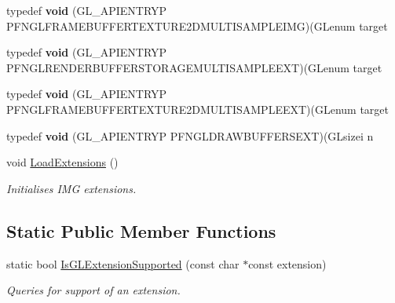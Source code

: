 \begin{DoxyCompactItemize}
\item 
\hypertarget{class_c_p_v_r_tgles2_ext_ac0e4abcfeeaaf1da925963d93e23a208}{typedef {\bfseries void} (G\+L\+\_\+\+A\+P\+I\+E\+N\+T\+R\+Y\+P P\+F\+N\+G\+L\+F\+R\+A\+M\+E\+B\+U\+F\+F\+E\+R\+T\+E\+X\+T\+U\+R\+E2\+D\+M\+U\+L\+T\+I\+S\+A\+M\+P\+L\+E\+I\+M\+G)(G\+Lenum target}\label{class_c_p_v_r_tgles2_ext_ac0e4abcfeeaaf1da925963d93e23a208}

\item 
\hypertarget{class_c_p_v_r_tgles2_ext_a30b0d1ac6df809ce53b9fc4727f64f67}{typedef {\bfseries void} (G\+L\+\_\+\+A\+P\+I\+E\+N\+T\+R\+Y\+P P\+F\+N\+G\+L\+R\+E\+N\+D\+E\+R\+B\+U\+F\+F\+E\+R\+S\+T\+O\+R\+A\+G\+E\+M\+U\+L\+T\+I\+S\+A\+M\+P\+L\+E\+E\+X\+T)(G\+Lenum target}\label{class_c_p_v_r_tgles2_ext_a30b0d1ac6df809ce53b9fc4727f64f67}

\item 
\hypertarget{class_c_p_v_r_tgles2_ext_aa1002af68291ea507e96280ccf63bdf0}{typedef {\bfseries void} (G\+L\+\_\+\+A\+P\+I\+E\+N\+T\+R\+Y\+P P\+F\+N\+G\+L\+F\+R\+A\+M\+E\+B\+U\+F\+F\+E\+R\+T\+E\+X\+T\+U\+R\+E2\+D\+M\+U\+L\+T\+I\+S\+A\+M\+P\+L\+E\+E\+X\+T)(G\+Lenum target}\label{class_c_p_v_r_tgles2_ext_aa1002af68291ea507e96280ccf63bdf0}

\item 
\hypertarget{class_c_p_v_r_tgles2_ext_a7c81cff8538e282ba685a095662de50e}{typedef {\bfseries void} (G\+L\+\_\+\+A\+P\+I\+E\+N\+T\+R\+Y\+P P\+F\+N\+G\+L\+D\+R\+A\+W\+B\+U\+F\+F\+E\+R\+S\+E\+X\+T)(G\+Lsizei n}\label{class_c_p_v_r_tgles2_ext_a7c81cff8538e282ba685a095662de50e}

\item 
void \hyperlink{class_c_p_v_r_tgles2_ext_adabcad176552a14aba8e9a7267fe7267}{Load\+Extensions} ()
\begin{DoxyCompactList}\small\item\em Initialises I\+M\+G extensions. \end{DoxyCompactList}\end{DoxyCompactItemize}
\subsection*{Static Public Member Functions}
\begin{DoxyCompactItemize}
\item 
static bool \hyperlink{class_c_p_v_r_tgles2_ext_a7befd944f6be5d248ffbbd3b43d11f81}{Is\+G\+L\+Extension\+Supported} (const char $\ast$const extension)
\begin{DoxyCompactList}\small\item\em Queries for support of an extension. \end{DoxyCompactList}\end{DoxyCompactItemize}
